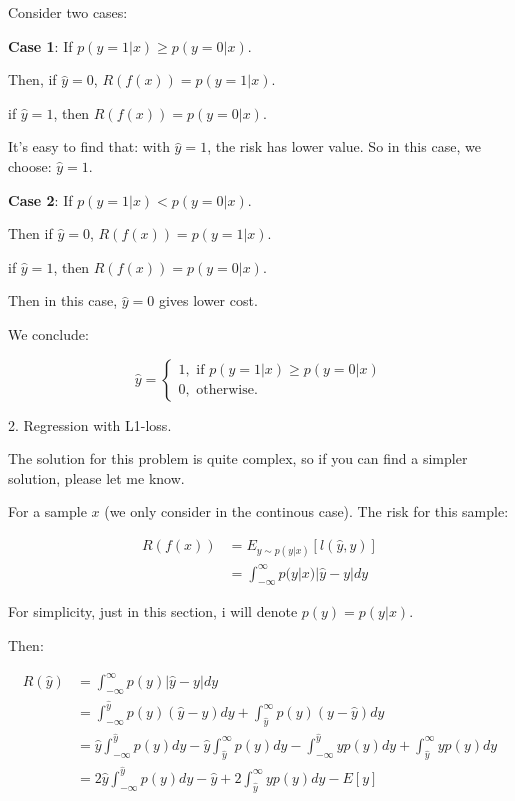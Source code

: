 \documentclass{article}
\begin{document}
Consider two cases:

\textbf{Case 1}: If $p(y=1|x)\geq p(y=0|x)$.

Then, if $\hat{y}=0$, $R(f(x))=p(y=1|x)$.

if $\hat{y}=1$, then $R(f(x))=p(y=0|x)$.

It's easy to find that: with $\hat{y}=1$, the risk has lower value. So in this case,
we choose: $\hat{y}=1$.

\textbf{Case 2}: If $p(y=1|x)<p(y=0|x)$.

Then if $\hat{y}=0$, $R(f(x))=p(y=1|x)$.

if $\hat{y}=1$, then $R(f(x))=p(y=0|x)$.

Then in this case, $\hat{y}=0$ gives lower cost.

We conclude:

$$
\hat{y}=
\begin{cases}
    1, \text{ if }p(y=1|x)\geq p(y=0|x)\\
    0, \text{ otherwise}.
\end{cases}
$$

2. Regression with L1-loss.

The solution for this problem is quite complex, so if you can find a simpler solution, please let me know.

For a sample $x$ (we only consider in the continous case). The risk for this sample:

\begin{equation}
    \begin{aligned}
        R(f(x)) &= E_{y\sim p(y|x)}[l(\hat{y},y)]\\
        &=\int_{-\infty}^{\infty}p(y|x)|\hat{y}-y|dy
    \end{aligned}
\end{equation}

For simplicity, just in this section, i will denote $p(y)=p(y|x)$.

Then: 

\begin{equation}
    \begin{aligned}
        R(\hat{y}) &= \int_{-\infty}^{\infty}p(y)|\hat{y}-y|dy\\
        &=\int_{-\infty}^{\hat{y}}p(y)(\hat{y}-y)dy+\int_{\hat{y}}^{\infty}p(y)(y-\hat{y})dy\\
        &=\hat{y}\int_{-\infty}^{\hat{y}}p(y)dy-\hat{y}\int_{\hat{y}}^{\infty}p(y)dy-\int_{-\infty}^{\hat{y}}yp(y)dy+\int_{\hat{y}}^{\infty}yp(y)dy\\
        &=2\hat{y}\int_{-\infty}^{\hat{y}}p(y)dy-\hat{y}+2\int_{\hat{y}}^{\infty}yp(y)dy-E[y]
    \end{aligned}
\end{equation}
\end{document}
